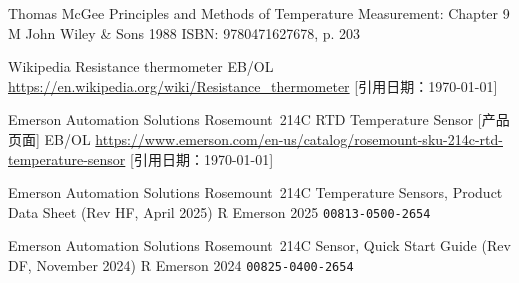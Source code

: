 {Thomas McGee}
{Principles and Methods of Temperature Measurement: Chapter 9}
{M}
{John Wiley \& Sons}
{1988}
{ISBN: 9780471627678, p. 203}

{Wikipedia}
{Resistance thermometer}
{EB/OL}
{\url{https://en.wikipedia.org/wiki/Resistance_thermometer}}
{[引用日期：\today]}
{}

{Emerson Automation Solutions}
{Rosemount\texttrademark~214C RTD Temperature Sensor [产品页面]}
{EB/OL}
{\url{https://www.emerson.com/en-us/catalog/rosemount-sku-214c-rtd-temperature-sensor}}
{[引用日期：\today]}
{}

{Emerson Automation Solutions}
{Rosemount\texttrademark~214C Temperature Sensors, Product Data Sheet (Rev HF, April 2025)}
{R}
{Emerson}
{2025}
{\texttt{00813-0500-2654}}

{Emerson Automation Solutions}
{Rosemount\texttrademark~214C Sensor, Quick Start Guide (Rev DF, November 2024)}
{R}
{Emerson}
{2024}
{\texttt{00825-0400-2654}}
